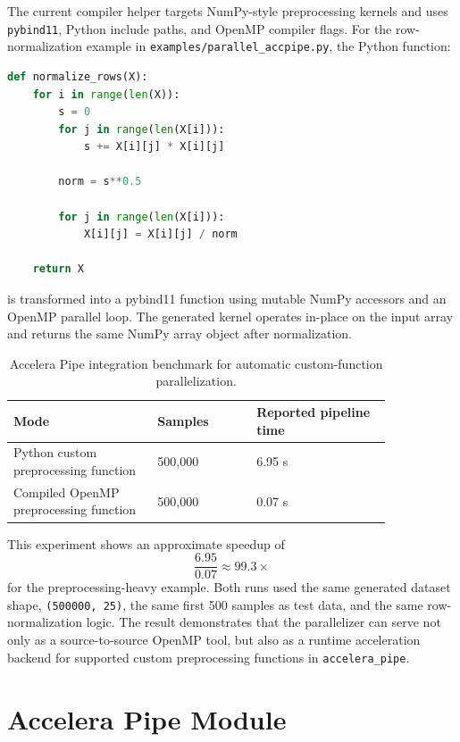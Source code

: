 \documentclass[11pt,a4paper]{article}
\newcommand{\modulepath}[1]{\texttt{#1}}
\begin{document}
The current compiler helper targets NumPy-style preprocessing kernels and uses
\texttt{pybind11}, Python include paths, and OpenMP compiler flags. For the
row-normalization example in \modulepath{examples/parallel\_accpipe.py}, the
Python function:

\begin{lstlisting}[language=Python]
def normalize_rows(X):
    for i in range(len(X)):
        s = 0
        for j in range(len(X[i])):
            s += X[i][j] * X[i][j]

        norm = s**0.5

        for j in range(len(X[i])):
            X[i][j] = X[i][j] / norm

    return X
\end{lstlisting}

is transformed into a pybind11 function using mutable NumPy accessors and an
OpenMP parallel loop. The generated kernel operates in-place on the input
array and returns the same NumPy array object after normalization.

\begin{table}[H]
\centering
\caption{Accelera Pipe integration benchmark for automatic custom-function
parallelization.}
\begin{tabular}{p{0.32\linewidth}p{0.22\linewidth}p{0.30\linewidth}}
\toprule
\textbf{Mode} & \textbf{Samples} & \textbf{Reported pipeline time}\\
\midrule
Python custom preprocessing function & 500,000 & 6.95 s\\
Compiled OpenMP preprocessing function & 500,000 & 0.07 s\\
\bottomrule
\end{tabular}
\end{table}

This experiment shows an approximate speedup of
\[
  \frac{6.95}{0.07} \approx 99.3\times
\]
for the preprocessing-heavy example. Both runs used the same generated dataset
shape, \texttt{(500000, 25)}, the same first 500 samples as test data, and the
same row-normalization logic. The result demonstrates that the parallelizer can
serve not only as a source-to-source OpenMP tool, but also as a runtime
acceleration backend for supported custom preprocessing functions in
\texttt{accelera\_pipe}.

\iffalse
\section{Accelera Pipe Module}
\end{document}
